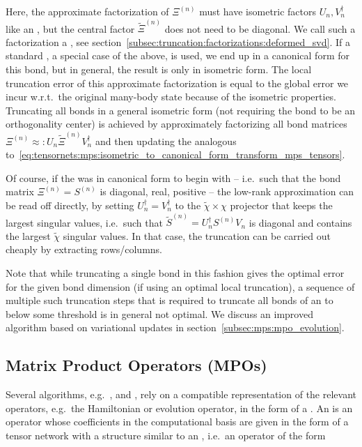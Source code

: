 Here, the approximate factorization of $\Xi^{(n)}$ must have isometric factors $U_n, V_n^\dagger$ like an , but the central factor $\tilde{\Xi}^{(n)}$ does not need to be diagonal.
%
We call such a factorization a , see section~\ref{subsec:truncation:factorizations:deformed_svd}.
%
If a standard , a special case of the above, is used, we end up in a canonical form for this bond, but in general, the result is only in isometric form.
%
The local truncation error of this approximate factorization is equal to the global error we incur w.r.t.~the original many-body state because of the isometric properties.
%
Truncating all bonds in a general isometric form (not requiring the bond to be an orthogonality center) is achieved by approximately factorizing all bond matrices $\Xi^{(n)} \approx: U_n \tilde{\Xi}^{(n)} V_n^\dagger$ and then updating the  analogous to~\eqref{eq:tensornets:mps:isometric_to_canonical_form_transform_mps_tensors}.

Of course, if the  was in canonical form to begin with -- i.e.~such that the bond matrix $\Xi^{(n)} = S^{(n)}$ is diagonal, real, positive -- the low-rank approximation can be read off directly, by setting $U_n^\dagger = V_n^\dagger$ to the $\tilde\chi \times \chi$ projector that keeps the largest singular values, i.e.~such that $\tilde{S}^{(n)} = U_n^\dagger S^{(n)} V_n$ is diagonal and contains the largest $\tilde\chi$ singular values.
%
In that case, the truncation can be carried out cheaply by extracting rows/columns.

Note that while truncating a single bond in this fashion gives the optimal error for the given bond dimension (if using an optimal local truncation), a sequence of multiple such truncation steps that is required to truncate all bonds of an  to below some threshold is in general not optimal.
%
We discuss an improved algorithm based on variational updates in section~\ref{subsec:mps:mpo_evolution}.

\subsection{Matrix Product Operators (MPOs)}
\label{subsec:mps:mpo}

Several  algorithms, e.g.~,  and , rely on a compatible representation of the relevant operators, e.g.~the Hamiltonian or evolution operator, in the form of a .
%
An  is an operator whose coefficients in the computational basis are given in the form of a tensor network with a structure similar to an , i.e.~an operator of the form

